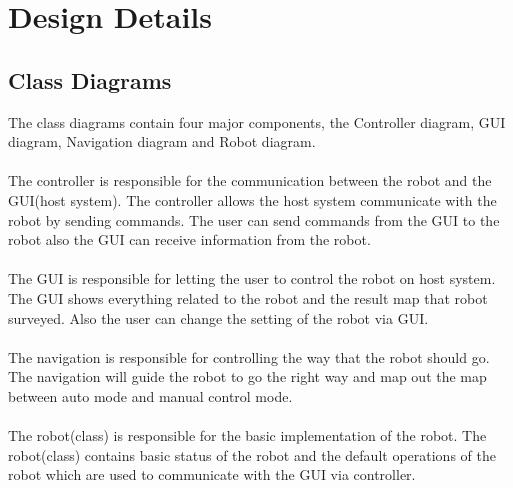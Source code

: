 \documentclass[11pt, a4paper]{report}
\begin{document}
\chapter{Design Details}%
\label{cha:DD2}

\section{Class Diagrams}
The class diagrams contain four major components, the Controller diagram, GUI diagram, Navigation diagram and Robot diagram.\\ \\
The controller is responsible for the communication between the robot and the GUI(host system).  The controller allows the host system communicate with the robot by sending commands. The user can send commands from the GUI to the robot also the GUI can receive information from the robot.\\ \\
The GUI is responsible for letting the user to control the robot on host system. The GUI shows everything related to the robot and the result map that robot surveyed. Also the user can change the setting of the robot via GUI.\\ \\
The navigation is responsible for controlling the way that the robot should go. The navigation will guide the robot to go the right way and map out the map between auto mode and manual control mode. \\ \\
The robot(class) is responsible for the basic implementation of the robot. The robot(class) contains basic status of the robot and the default operations of the robot which are used to communicate with the GUI via controller.
\end{document}
